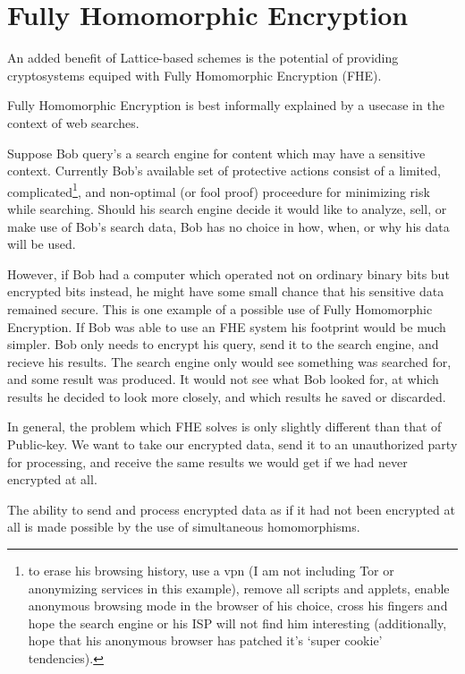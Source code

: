 \section{Fully Homomorphic Encryption} 

An added benefit of Lattice-based schemes is the potential of providing cryptosystems equiped with Fully Homomorphic Encryption (FHE).

Fully Homomorphic Encryption is best informally explained by a usecase in the context of web searches. 

\begin{exmp}
    
    Suppose Bob query's a search engine for content which may have a sensitive context. 
    Currently Bob's available set of protective actions consist of a limited, complicated\footnote{to erase his browsing history, use a vpn (I am not including Tor or anonymizing services in this example), remove all scripts and applets, enable anonymous browsing mode in the browser of his choice, cross his fingers and hope the search engine or his ISP will not find him interesting (additionally, hope that his anonymous browser has patched it's `super cookie' tendencies).}, and non-optimal (or fool proof) proceedure for minimizing risk while searching. Should his search engine decide it would like to analyze, sell, or make use of Bob's search data, Bob has no choice in how, when, or why his data will be used. 
    
    However, if Bob had a computer which operated not on ordinary binary bits but encrypted bits instead, he might have some small chance that his sensitive data remained secure.
    This is one example of a possible use of Fully Homomorphic Encryption.
    If Bob was able to use an FHE system his footprint would be much simpler.
    Bob only needs to encrypt his query, send it to the search engine, and recieve his results.
    The search engine only would see something was searched for, and some result was produced. It would not see what Bob looked for, at which results he decided to look more closely, and which results he saved or discarded. 
\end{exmp}

    
In general, the problem which FHE solves is only slightly different than that of Public-key. We want to take our encrypted data, send it to an unauthorized party for processing, and receive the same results we would get if we had never encrypted at all.


The ability to send and process encrypted data as if it had not been encrypted at all is made possible by the use of simultaneous homomorphisms.

